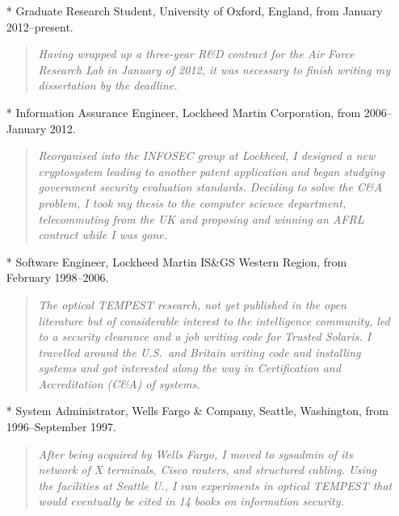 \documentclass[letterpaper]{article}
\begin{document}
\begin{itemize}
	\item[*] Graduate Research Student, University of Oxford, England, from January 2012--present.

		\begin{quote}\vspace{-2mm}
			\emph{Having wrapped up a three-year R\&D contract for the Air Force Research
			Lab in January of 2012, it was necessary to finish writing my dissertation by
			the deadline.}
		\end{quote}

	\item[*] Information Assurance Engineer, Lockheed Martin Corporation, from 2006--January 2012.

		\begin{quote}\vspace{-2mm}
			\emph{Reorganised into the INFOSEC group at Lockheed, I designed a new
			cryptosystem leading to another patent application and began studying
			government security evaluation standards.  Deciding to solve the C\&A problem,
			I took my thesis to the computer science department, telecommuting from the UK and
			proposing and winning an AFRL contract while I was gone.}
		\end{quote}

	\item[*] Software Engineer, Lockheed Martin IS\&GS Western Region, from February 1998--2006.

		\begin{quote}\vspace{-2mm}
			\emph{The optical TEMPEST research, not yet published in the open literature but of
			considerable interest to the intelligence community, led to a security clearance and
			a job writing code for Trusted Solaris.  I travelled around the U.S.\ and Britain
			writing code and installing systems and got interested along the way in
			Certification and Accreditation (C\&A) of systems.}
		\end{quote}

	\item[*] System Administrator, Wells Fargo \& Company, Seattle, Washington,
		from 1996--September 1997.

		\begin{quote}\vspace{-2mm}
			\emph{After being acquired by Wells Fargo, I moved to sysadmin of its network
			of X terminals, Cisco routers, and structured cabling.  Using the facilities
			at Seattle U., I ran experiments in optical TEMPEST that would eventually
			be cited in 14 books on information security.}
		\end{quote}


\end{itemize}
\end{document}
